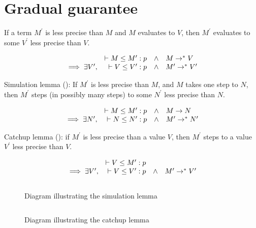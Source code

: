 \clearpage

\section{Gradual guarantee}

If a term $M^\prime$ is less precise than $M$ and $M$ evaluates to $V$,
then $M^\prime$ evaluates to some $V^\prime$ less precise than $V$.

\newcommand\wwedge{\quad\wedge\quad}

\[
\begin{array}{rrcl}
  & \vdash M \le M^\prime : p & \wedge & M \to^\ast V
\\ \implies \exists V^\prime , & \vdash V \le V^\prime : p & \wedge & M^\prime \to^\ast V^\prime
\end{array}
\]

Simulation lemma (): If $M^\prime$ is less precise than $M$, and $M$ takes one step to $N$,
then $M^\prime$ steps (in possibly many steps) to some $N^\prime$ less precise than $N$.

\[
\begin{array}{rrcl}
  & \vdash M \le M^\prime : p & \wedge & M \to N
\\ \implies \exists N^\prime , & \vdash N \le N^\prime : p & \wedge & M^\prime \to^\ast N^\prime
\end{array}
\]

Catchup lemma (): if $M^\prime$ is less precise than a value $V$, then $M^\prime$ steps
to a value $V^\prime$ less precise than $V$.

\[
\begin{array}{rrcl}
  & \vdash V \le M^\prime : p & &
\\ \implies \exists V^\prime , & \vdash V \le V^\prime : p & \wedge & M^\prime \to^\ast V^\prime
\end{array}
\]

\begin{figure}
$$

$$
\caption{Diagram illustrating the simulation lemma}
\label{fig:sim}
\end{figure}

\begin{figure}
$$  $$
\caption{Diagram illustrating the catchup lemma}
\label{fig:catchup}
\end{figure}
